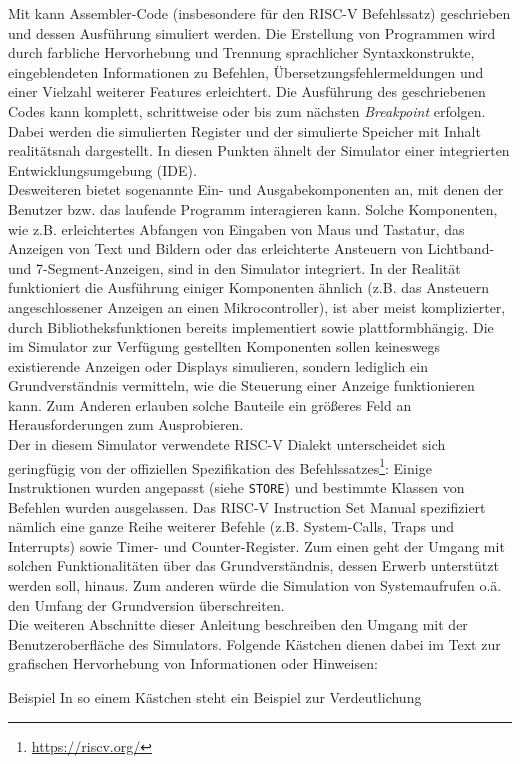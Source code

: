 Mit \erasim kann Assembler-Code (insbesondere für den RISC-V Befehlssatz)
geschrieben und dessen Ausführung simuliert werden. Die Erstellung von
Programmen wird durch farbliche Hervorhebung und Trennung sprachlicher
Syntaxkonstrukte, eingeblendeten Informationen zu Befehlen,
Übersetzungsfehlermeldungen und einer Vielzahl weiterer Features erleichtert.
Die Ausführung des geschriebenen Codes kann komplett, schrittweise oder bis zum
nächsten \emph{Breakpoint} erfolgen. Dabei werden die simulierten Register und
der simulierte Speicher mit Inhalt realitätsnah dargestellt. In diesen Punkten
ähnelt der Simulator einer integrierten Entwicklungsumgebung (IDE).\\
Desweiteren bietet \erasim sogenannte Ein- und Ausgabekomponenten an, mit denen
der Benutzer bzw. das laufende Programm interagieren kann. Solche Komponenten,
wie z.B. erleichtertes Abfangen von Eingaben von Maus und Tastatur, das Anzeigen
von Text und Bildern oder das erleichterte Ansteuern von Lichtband- und
7-Segment-Anzeigen, sind in den Simulator integriert. In der Realität
funktioniert die Ausführung einiger Komponenten ähnlich (z.B. das Ansteuern
angeschlossener Anzeigen an einen Mikrocontroller), ist aber meist
komplizierter, durch Bibliotheksfunktionen bereits implementiert sowie
plattformbhängig. Die im Simulator zur Verfügung gestellten Komponenten sollen
keineswegs existierende Anzeigen oder Displays simulieren, sondern lediglich ein
Grundverständnis vermitteln, wie die Steuerung einer Anzeige funktionieren kann.
Zum Anderen erlauben solche Bauteile ein größeres Feld an Herausforderungen zum
Ausprobieren.\\ Der in diesem Simulator verwendete RISC-V Dialekt unterscheidet
sich geringfügig von der offiziellen Spezifikation des
Befehlssatzes\footnote{\url{https://riscv.org/}}: Einige Instruktionen wurden
angepasst (siehe \texttt{STORE}) und bestimmte Klassen von Befehlen wurden
ausgelassen. Das RISC-V Instruction Set Manual spezifiziert nämlich eine ganze
Reihe weiterer Befehle (z.B. System-Calls, Traps und Interrupts) sowie Timer-
und Counter-Register. Zum einen geht der Umgang mit solchen Funktionalitäten
über das Grundverständnis, dessen Erwerb unterstützt werden soll, hinaus. Zum
anderen würde die Simulation von Systemaufrufen o.ä. den Umfang der Grundversion
überschreiten.\\

Die weiteren Abschnitte dieser Anleitung beschreiben den Umgang mit der
Benutzeroberfläche des Simulators. Folgende Kästchen dienen dabei im Text zur
grafischen Hervorhebung von Informationen oder Hinweisen:
\begin{exampleblock}{Beispiel}
	In so einem Kästchen steht ein Beispiel zur Verdeutlichung
\end{exampleblock}

